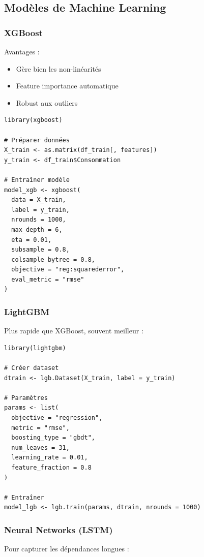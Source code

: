 \documentclass[12pt,a4paper]{article}
\begin{document}
\subsection{Modèles de Machine Learning}

\subsubsection{XGBoost}

Avantages :
\begin{itemize}
    \item Gère bien les non-linéarités
    \item Feature importance automatique
    \item Robust aux outliers
\end{itemize}

\begin{verbatim}
library(xgboost)

# Préparer données
X_train <- as.matrix(df_train[, features])
y_train <- df_train$Consommation

# Entraîner modèle
model_xgb <- xgboost(
  data = X_train,
  label = y_train,
  nrounds = 1000,
  max_depth = 6,
  eta = 0.01,
  subsample = 0.8,
  colsample_bytree = 0.8,
  objective = "reg:squarederror",
  eval_metric = "rmse"
)
\end{verbatim}

\subsubsection{LightGBM}

Plus rapide que XGBoost, souvent meilleur :

\begin{verbatim}
library(lightgbm)

# Créer dataset
dtrain <- lgb.Dataset(X_train, label = y_train)

# Paramètres
params <- list(
  objective = "regression",
  metric = "rmse",
  boosting_type = "gbdt",
  num_leaves = 31,
  learning_rate = 0.01,
  feature_fraction = 0.8
)

# Entraîner
model_lgb <- lgb.train(params, dtrain, nrounds = 1000)
\end{verbatim}

\subsubsection{Neural Networks (LSTM)}

Pour capturer les dépendances longues :
\end{document}
